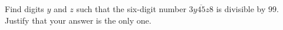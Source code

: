 Find digits $y$ and $z$ such that the six-digit number $\overline{3y45z8}$ is divisible by $99$. Justify that your answer is the only one.
